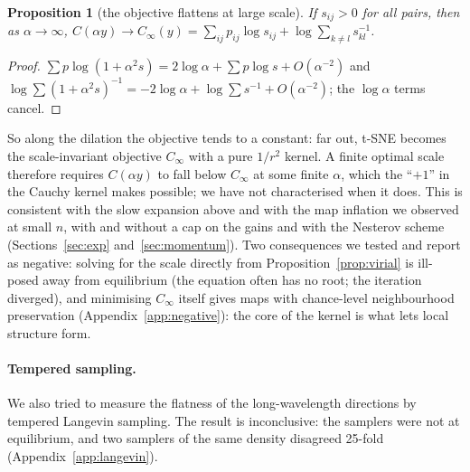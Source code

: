 \documentclass[11pt]{article}
\newtheorem{proposition}{Proposition}
\begin{document}
\begin{proposition}[the objective flattens at large scale]\label{prop:flat}
If $s_{ij}>0$ for all pairs, then as $\alpha\to\infty$,
$C(\alpha y)\to C_\infty(y)=\sum_{ij}p_{ij}\log s_{ij}+\log\sum_{k\neq l}s_{kl}^{-1}$.
\end{proposition}
\begin{proof}
$\sum p\log(1+\alpha^2s)=2\log\alpha+\sum p\log s+O(\alpha^{-2})$ and
$\log\sum(1+\alpha^2s)^{-1}=-2\log\alpha+\log\sum s^{-1}+O(\alpha^{-2})$; the $\log\alpha$ terms cancel.
\end{proof}
\noindent So along the dilation the objective tends to a constant: far out, t-SNE becomes the scale-invariant
objective $C_\infty$ with a pure $1/r^2$ kernel. A finite optimal scale therefore requires $C(\alpha y)$ to fall below
$C_\infty$ at some finite $\alpha$, which the ``$+1$'' in the Cauchy kernel makes possible; we have not characterised
when it does. This is consistent with the slow expansion above and with
the map inflation we observed at small $n$, with and without a cap on the gains and with the Nesterov scheme
(Sections~\ref{sec:exp} and~\ref{sec:momentum}). Two consequences we tested and report as negative:
solving for the scale directly from Proposition~\ref{prop:virial} is ill-posed away from equilibrium (the equation often
has no root; the iteration diverged), and minimising $C_\infty$ itself gives maps with chance-level neighbourhood
preservation (Appendix~\ref{app:negative}): the core of the kernel is what lets local structure form.

\paragraph{Tempered sampling.} We also tried to measure the flatness of the long-wavelength directions by tempered Langevin sampling. The result is inconclusive: the samplers were not at equilibrium, and two samplers of the same density disagreed 25-fold (Appendix~\ref{app:langevin}).
\end{document}
